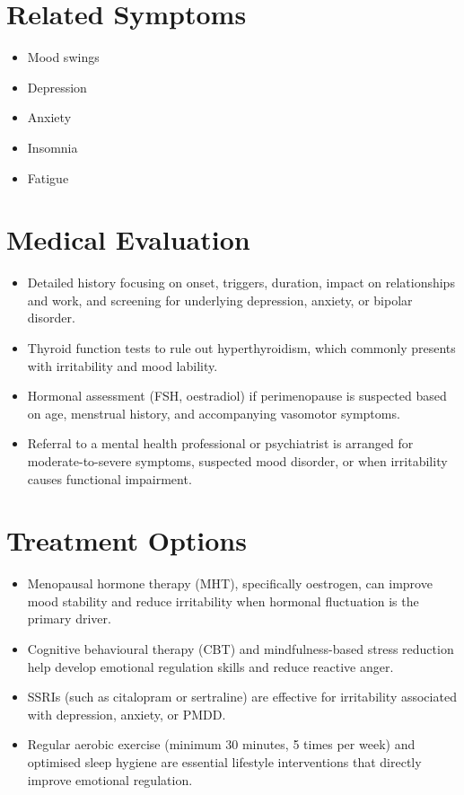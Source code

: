 \section*{Related Symptoms}
\begin{itemize}
  \item Mood swings
  \item Depression
  \item Anxiety
  \item Insomnia
  \item Fatigue
\end{itemize}


\section*{Medical Evaluation}
\begin{itemize}
  \item Detailed history focusing on onset, triggers, duration, impact on relationships and work, and screening for underlying depression, anxiety, or bipolar disorder.
  \item Thyroid function tests to rule out hyperthyroidism, which commonly presents with irritability and mood lability.
  \item Hormonal assessment (FSH, oestradiol) if perimenopause is suspected based on age, menstrual history, and accompanying vasomotor symptoms.
  \item Referral to a mental health professional or psychiatrist is arranged for moderate-to-severe symptoms, suspected mood disorder, or when irritability causes functional impairment.
\end{itemize}

\section*{Treatment Options}
\begin{itemize}
  \item Menopausal hormone therapy (MHT), specifically oestrogen, can improve mood stability and reduce irritability when hormonal fluctuation is the primary driver.
  \item Cognitive behavioural therapy (CBT) and mindfulness-based stress reduction help develop emotional regulation skills and reduce reactive anger.
  \item SSRIs (such as citalopram or sertraline) are effective for irritability associated with depression, anxiety, or PMDD.
  \item Regular aerobic exercise (minimum 30 minutes, 5 times per week) and optimised sleep hygiene are essential lifestyle interventions that directly improve emotional regulation.
\end{itemize}

